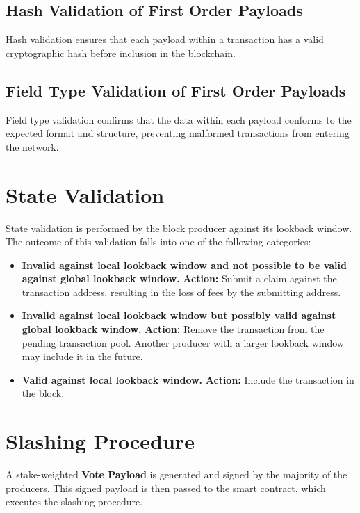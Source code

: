 \documentclass{article}
\begin{document}
\subsection{Hash Validation of First Order Payloads}
Hash validation ensures that each payload within a transaction has a valid
cryptographic hash before inclusion in the blockchain.

\subsection{Field Type Validation of First Order Payloads}
Field type validation confirms that the data within each payload conforms to
the expected format and structure, preventing malformed transactions from
entering the network.

\section{State Validation}
State validation is performed by the block producer against its lookback
window. The outcome of this validation falls into one of the following
categories:

\begin{itemize}
    \item \textbf{Invalid against local lookback window and not possible to be valid against global lookback window.}
          \newline
          \textbf{Action:} Submit a claim against the transaction address, resulting in the loss of fees by the submitting address.

    \item \textbf{Invalid against local lookback window but possibly valid against global lookback window.}
          \newline
          \textbf{Action:} Remove the transaction from the pending transaction pool. Another producer with a larger lookback window may include it in the future.

    \item \textbf{Valid against local lookback window.}
          \newline
          \textbf{Action:} Include the transaction in the block.
\end{itemize}

\section{Slashing Procedure}
A stake-weighted \textbf{Vote Payload} is generated and signed by the majority
of the producers. This signed payload is then passed to the smart contract,
which executes the slashing procedure.
\end{document}

